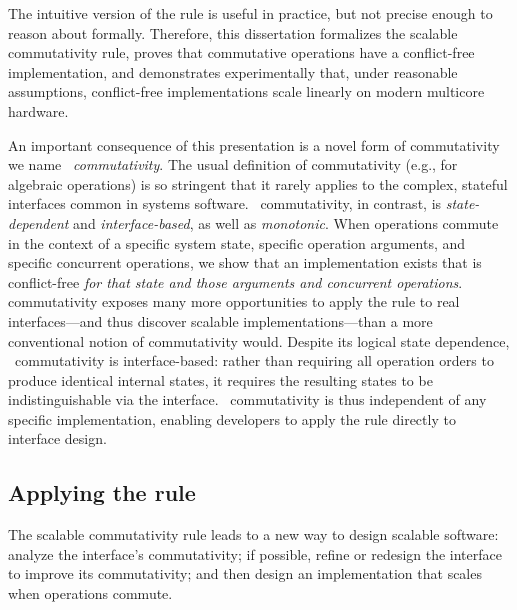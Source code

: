 The intuitive version of the rule is useful in practice, but
not precise enough to reason
about formally.
%
Therefore, this dissertation formalizes the scalable commutativity
rule, proves that commutative operations have a conflict-free
implementation, and demonstrates experimentally that, under reasonable
assumptions, conflict-free implementations scale linearly on modern
multicore hardware.


An important consequence of this presentation is a novel form of
commutativity we name \emph{\SIM\ commutativity}.
%
The usual definition of commutativity (e.g., for algebraic operations)
is so stringent that it rarely applies to the complex, stateful
interfaces common in systems software.
%
\SIM\ commutativity, in contrast, is \emph{state-dependent} and
\emph{interface-based}, as well as \emph{monotonic}.
%
When operations commute in the context of a specific system state,
specific operation arguments, and specific concurrent operations, we
show that an implementation exists that is conflict-free \emph{for that state
  and those arguments and concurrent operations}.
%
\SIM commutativity exposes many more opportunities to apply the rule to real
interfaces---and thus discover scalable implementations---than a more
conventional notion of commutativity would.
%
Despite its logical state dependence, \SIM\ commutativity is
interface-based: rather than requiring all operation orders to produce
identical internal states, it requires the resulting states to be
indistinguishable via the interface.
%
\SIM\ commutativity is thus independent of any specific
implementation, enabling developers to apply the rule directly to
interface design.


\subsection{Applying the rule}

The scalable commutativity rule leads to a new way to design scalable
software:
%
analyze the interface's commutativity; if possible, refine or redesign
the interface to improve its commutativity; and then design an
implementation that scales when operations commute.

